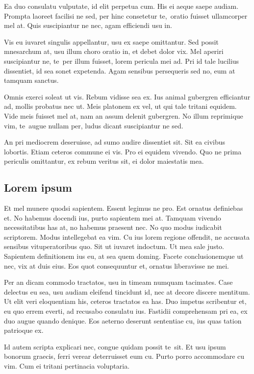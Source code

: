 Ea duo consulatu vulputate, id elit perpetua cum. His ei aeque saepe audiam. Prompta laoreet facilisi ne sed, per hinc consetetur te,~oratio fuisset ullamcorper mel at. Quis suscipiantur ne nec, agam efficiendi usu in.

Vis eu iuvaret singulis appellantur, usu ex saepe omittantur. Sed possit mnesarchum at, usu illum choro oratio in, et debet dolor vix. Mel aperiri suscipiantur ne, te~per illum fuisset, lorem pericula mei ad. Pri id tale lucilius dissentiet, id sea sonet expetenda. Agam sensibus persequeris sed no, eum at tamquam sanctus.

Omnis exerci soleat ut vis. Rebum vidisse sea ex. Ius animal gubergren efficiantur ad, mollis probatus nec ut. Meis platonem ex vel, ut qui tale tritani equidem. Vide meis fuisset mel at, nam an assum delenit gubergren. No illum reprimique vim, te~augue nullam per, ludus dicant suscipiantur ne sed.

An pri mediocrem deseruisse, ad sumo audire dissentiet sit. Sit ea civibus lobortis. Etiam ceteros commune ei vis. Pro ei equidem vivendo. Quo ne prima periculis omittantur, ex rebum veritus sit, ei dolor maiestatis mea.

\subsection{Lorem ipsum}

Et mel munere quodsi sapientem. Essent legimus ne pro. Est ornatus definiebas et. No habemus docendi ius, purto sapientem mei at. Tamquam vivendo necessitatibus has at, no habemus praesent nec. No quo modus iudicabit scriptorem. Modus intellegebat ea vim. Cu ius lorem regione offendit, ne accusata sensibus vituperatoribus quo. Sit ut iuvaret indoctum. Ut mea sale justo. Sapientem definitionem ius eu, at sea quem doming. Facete conclusionemque ut nec, vix at duis eius. Eos quot consequuntur et, ornatus liberavisse ne mei.

Per an dicam commodo tractatos, usu in timeam numquam tacimates. Case delectus eu sea, usu audiam eleifend tincidunt id, nec at decore discere mentitum. Ut elit veri eloquentiam his, ceteros tractatos ea has. Duo impetus scribentur et, eu quo errem everti, ad recusabo consulatu ius. Fastidii comprehensam pri ea, ex duo augue quando denique. Eos aeterno deserunt sententiae cu, ius quas tation patrioque ex.

Id autem scripta explicari nec, congue quidam possit te~sit. Et usu ipsum bonorum graecis, ferri verear deterruisset eum cu. Purto porro accommodare cu vim. Cum ei tritani pertinacia voluptaria.